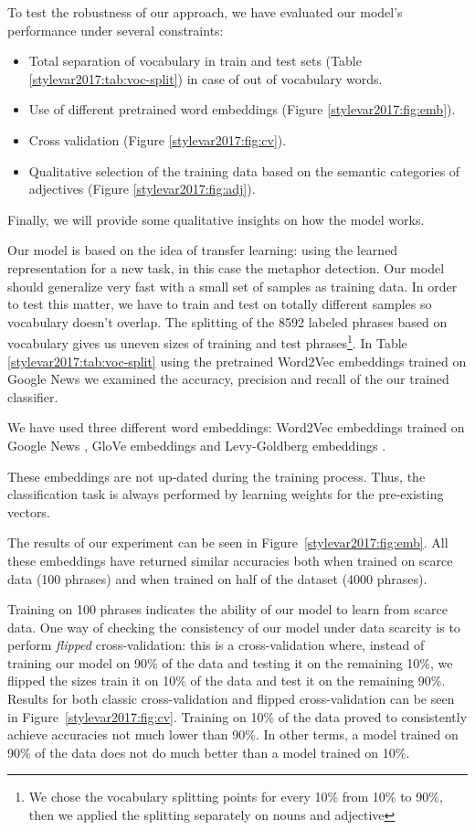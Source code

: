 To test the robustness of our approach, we have evaluated our model's performance under several constraints: 
\begin{itemize}
\item Total separation of vocabulary in train and test sets (Table \ref{stylevar2017:tab:voc-split}) in case of out of vocabulary words.
\item Use of different pretrained word embeddings (Figure \ref{stylevar2017:fig:emb}).
\item Cross validation (Figure \ref{stylevar2017:fig:cv}).
\item Qualitative selection of the training data based on the semantic categories of adjectives (Figure \ref{stylevar2017:fig:adj}).
\end{itemize}
Finally, we will provide some qualitative insights on how the model works.


Our model is based on the idea of transfer learning: using the learned representation for a new task, in this case the metaphor detection. Our model should generalize very fast with a small set of samples as training data. In order to test this matter, we have to train and test on totally different samples so vocabulary doesn't overlap. The splitting of the 8592 labeled phrases based on vocabulary gives us uneven sizes of training and test phrases\footnote{We chose the vocabulary splitting points for every 10\% from 10\% to 90\%, then we applied the splitting separately on nouns and adjective}. In Table \ref{stylevar2017:tab:voc-split}  using the pretrained Word2Vec embeddings trained on Google News \cite{DBLP:journals/corr/abs-1301-3781} we examined the accuracy, precision and recall of the our trained classifier. 

We have used three different word embeddings: Word2Vec embeddings trained on Google News \cite{DBLP:journals/corr/abs-1301-3781}, GloVe embeddings \cite{pennington2014glove} and Levy-Goldberg embeddings \cite{levy2014dependency}. 

These embeddings are not up-dated during the training process. Thus, the classification task is always performed by learning  weights for the pre-existing vectors.

The results of our experiment can be seen in Figure~\ref{stylevar2017:fig:emb}. All these embeddings have returned similar accuracies both when trained on scarce data (100 phrases) and when trained on half of the dataset (4000 phrases).  

Training on 100 phrases indicates the ability of our model to learn from scarce data. One way of checking the consistency of our model under data scarcity is to perform \textit{flipped} cross-validation: this is a cross-validation where, instead of training our model on 90\% of the data and testing it on the remaining 10\%, we flipped the sizes train it on 10\% of the data and test it on the remaining 90\%. Results for both classic cross-validation and flipped cross-validation can be seen in Figure~\ref{stylevar2017:fig:cv}. Training on 10\% of the data proved to consistently achieve accuracies not much lower than 90\%.  In other terms, a model trained on 90\% of the data  does not do much better than a model trained on 10\%.

